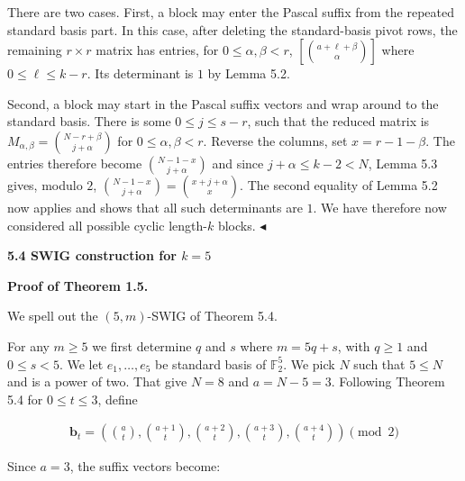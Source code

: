 \documentclass[10pt,a4paper]{article}
\begin{document}
There are two cases. First, a block may enter the Pascal suffix from the repeated
standard basis part. In this case, after deleting the standard-basis pivot rows, the
remaining $r\times r$ matrix has entries, for $0\leq\alpha,\beta<r$,
$\left[\binom{a+\ell+\beta}{\alpha}\right]$
where $0\leq\ell\leq k-r$. Its determinant is $1$ by
Lemma 5.2.\par




Second, a block may start in the Pascal suffix vectors and wrap around to the standard basis. There is some $0\leq j\leq s-r$, such that the reduced matrix is
$M_{\alpha,\beta}=\binom{N-r+\beta}{j+\alpha}$
for $0\leq\alpha,\beta<r$. Reverse the columns, set $x=r-1-\beta$. The entries therefore become
$\binom{N-1-x}{j+\alpha}$
and since $j+\alpha\leq k-2<N$, Lemma 5.3 gives, modulo
$2$,
$\binom{N-1-x}{j+\alpha}=\binom{x+j+\alpha}{x}.$
The second equality of Lemma 5.2 now applies and shows that all such determinants are $1$.
We have therefore now considered all possible cyclic length-$k$ blocks.
$\blacktriangleleft$\par






\par\medskip\noindent\textbf{
5.4 SWIG construction for $k=5$
}\par




\par\medskip\noindent\textbf{Proof of Theorem 1.5.}\par




We spell out the $(5,m)$-SWIG of Theorem 5.4.\par




For any $m\geq 5$ we first determine $q$ and $s$ where
$m=5q+s$, with $q\geq 1$ and $0\leq s<5$. We let
$e_{1},\ldots,e_{5}$ be standard basis of $\mathbb{F}_{2}^{5}$.
We pick $N$ such that $5\leq N$ and is a power of two. That give $N=8$ and $a=N-5=3$. Following Theorem 5.4 for
$0\leq t\leq 3$, define\par


\[\begin{gathered}
\mathbf{b}_{t}=\left(\binom{a}{t},\binom{a+1}{t},\binom{a+2}{t},\binom{a+3}{t},\binom{a+4}{t}\right)\pmod{2}
\end{gathered}\]


Since $a=3$, the suffix vectors become:\par
\end{document}

